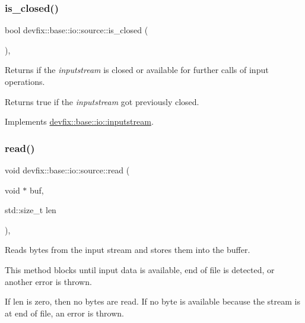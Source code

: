 \subsubsection{\texorpdfstring{is\+\_\+closed()}{is\_closed()}}
{\footnotesize\ttfamily bool devfix\+::base\+::io\+::source\+::is\+\_\+closed (\begin{DoxyParamCaption}{ }\end{DoxyParamCaption})\hspace{0.3cm}{\ttfamily [override]}, {\ttfamily [virtual]}}



Returns if the {\itshape inputstream} is closed or available for further calls of input operations. 

\begin{DoxyReturn}{Returns}
true if the {\itshape inputstream} got previously closed. 
\end{DoxyReturn}


Implements \hyperlink{structdevfix_1_1base_1_1io_1_1inputstream_a9da6b400424ff476ed0479193c219fa9}{devfix\+::base\+::io\+::inputstream}.

\mbox{\label{structdevfix_1_1base_1_1io_1_1source_a9fbd4d20aa150910ced44018e1b3156a}} 
\subsubsection{\texorpdfstring{read()}{read()}}
{\footnotesize\ttfamily void devfix\+::base\+::io\+::source\+::read (\begin{DoxyParamCaption}\item[{void $\ast$}]{buf,  }\item[{std\+::size\+\_\+t}]{len }\end{DoxyParamCaption})\hspace{0.3cm}{\ttfamily [override]}, {\ttfamily [virtual]}}



Reads bytes from the input stream and stores them into the buffer. 

This method blocks until input data is available, end of file is detected, or another error is thrown.

If len is zero, then no bytes are read. If no byte is available because the stream is at end of file, an error is thrown.

